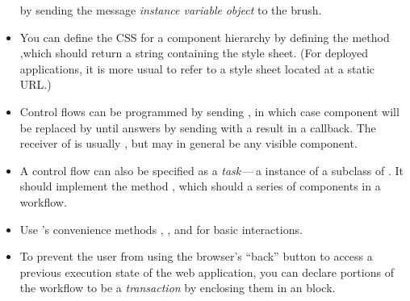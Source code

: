 \documentclass[a4paper,10pt,twoside]{book}
\begin{document}
\begin{itemize}
by sending the message  \emph{instance variable}  \emph{object} to the
brush.
\item You can define the CSS for a component hierarchy by defining the method ,which should return a string containing the style sheet.
(For deployed applications, it is more usual to refer to a style sheet located at a
static URL.)
\item Control flows can be programmed by sending , in which case component
 will be replaced by  until  answers by sending  with a
result in a callback.
The receiver of  is usually , but may in general be any visible
component.
\item A control flow can also be specified as a \emph{task}\,---\,a instance of a
subclass of . It should implement the method , which should 
a series of components in a workflow.
\item Use 's convenience methods , ,
 and  for basic interactions.
\item To prevent the user from using the browser's ``back'' button to access a previous
execution state of the web application, you can declare portions of the workflow to be a
\emph{transaction} by enclosing them in an  block.
\end{itemize}

\ifx\wholebook\relax\else 
   
   
\end{document}
